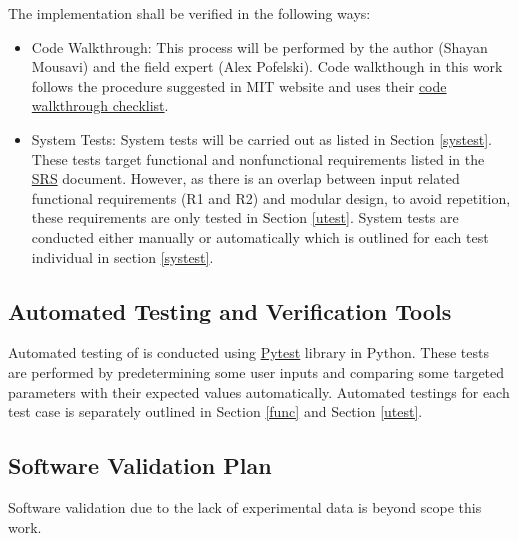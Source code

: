 \documentclass[12pt, titlepage]{article}
\begin{document}
The implementation shall be verified in the following ways:
\begin{itemize}
	\item Code Walkthrough: This process will be performed by the author (Shayan Mousavi) and the field expert (Alex Pofelski). Code walkthough in this work follows the procedure suggested in MIT website \citep{Checklis7:online} and uses their \href{http://www.mit.edu/~mbarker/ideas/review.txt}{code walkthrough checklist}.
	
	\item System Tests:  System tests will be carried out as listed in Section \ref{systest}. These tests target functional and nonfunctional requirements listed in the \href{https://github.com/shmouses/SPDFM/tree/master/docs/SRS}{SRS} document. However, as there is an overlap between input related functional requirements (R1 and R2) and \progname{} modular design, to avoid repetition, these requirements are only tested in Section \ref{utest}. System tests are conducted either manually or automatically which is outlined for each test individual in section \ref{systest}. 
\end{itemize}



\subsection{Automated Testing and Verification Tools}

Automated testing of \progname{} is conducted using \href{pytest.org}{Pytest} library in Python.
These tests are performed by predetermining some user inputs and comparing some targeted  parameters with their expected values automatically. Automated testings for each test case is separately outlined in Section \ref{func} and Section \ref{utest}.

\subsection{Software Validation Plan}
 
Software validation due to the lack of experimental data is beyond scope this work.
 
\end{document}
